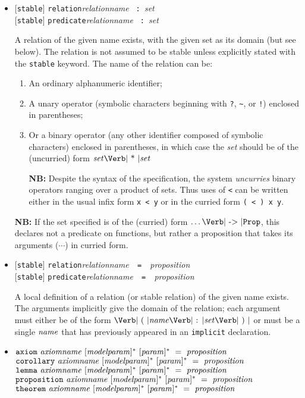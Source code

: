 \documentclass[12pt]{article}
\newcommand{\keywd}[1]{\mbox{\texttt{#1}}\xspace}
\newcommand{\AXIOM}{\keywd{axiom}}
\newcommand{\CONST}{\keywd{const}}
\newcommand{\COROLLARY}{\keywd{corollary}}
\newcommand{\IMPLICIT}{\keywd{implicit}}
\newcommand{\LEMMA}{\keywd{lemma}}
\newcommand{\PROP}{\keywd{Prop}}
\newcommand{\PROPOSITION}{\keywd{proposition}}
\newcommand{\PREDICATE}{\keywd{predicate}}
\newcommand{\RELATION}{\keywd{relation}}
\newcommand{\STABLE}{\keywd{stable}}
\newcommand{\THEOREM}{\keywd{theorem}}
\newcommand{\metav}[1]{\mbox{\textit{#1}}\xspace}
\newcommand{\Ident}{\metav{name}}
\newcommand{\Identifier}{\Ident}
\newcommand{\Setexp}{\metav{set}}
\newcommand{\Proposition}{\metav{proposition}}
\newcommand{\Param}{\metav{param}}
\newcommand{\MParam}{\metav{modelparam}}
\newcommand{\Term}{\metav{term}}
\newcommand{\COLON}{\mbox{\Verb| : |}}
\newcommand{\EQUALS}{\mbox{\Verb| = |}}
\newcommand{\LPAREN}{\mbox{\Verb| ( |}}
\newcommand{\RPAREN}{\mbox{\Verb| ) |}}
\newcommand{\TIMES}{\mbox{\Verb| * |}}
\newcommand{\TO}{\mbox{\Verb| -> |}}
\newcommand{\NB}{\textbf{NB: }}
\begin{document}
\begin{itemize}
      A local abbreviation of a term.  The set containing the constant
      may be inferred from the \Term.  The possible names are the same
      as in the previous case for \CONST.

\item{} [\STABLE{}] \RELATION \metav{relationname} \COLON \Setexp\\
     {} [\STABLE{}] \PREDICATE \metav{relationname} \COLON \Setexp
  
     A relation of the given name exists, with the given set as its
     domain (but see below).  The relation is not assumed to be stable
     unless explicitly stated with the \STABLE keyword.  The name of
     the relation can be:
\begin{enumerate}
\item  An ordinary alphanumeric identifier;
\item  A unary operator (symbolic characters beginning with \Verb|?|, \Verb|~|, or \Verb|!|) enclosed in parentheses;
\item  Or a binary operator (any other identifier composed of symbolic characters) enclosed in parentheses, in which case the \Setexp should be of the (uncurried) form $\Setexp \TIMES \Setexp$

\NB Despite the syntax of the specification, the system \emph{uncurries}
binary operators ranging over a product of sets.  Thus uses of
\Verb|<| can be written either in the usual infix form \Verb|x < y| or
in the curried form \Verb|( < ) x y|.
\end{enumerate}

\NB If the set specified is of the (curried) form $\ldots \TO \PROP$,
this declares not a predicate on functions, but rather a proposition
that takes its arguments ($\cdots$) in curried form.

\item{} [\STABLE{}] \RELATION \metav{relationname}\ \EQUALS\ \Proposition\\
     {} [\STABLE{}] \PREDICATE \metav{relationname}\ \EQUALS\ \Proposition
  
     A local definition of a relation (or stable relation) of the
     given name exists.  The arguments implicitly give the domain of
     the relation; each argument must either be of the form $\LPAREN
     \Identifier \COLON \Setexp \RPAREN$ or must be a single
     $\Identifier$ that has previously appeared in an \IMPLICIT
     declaration.


\item $\AXIOM\ \metav{axiomname}\ [\MParam]^*\ [\Param]^*\ =\ \Proposition$\\
      $\COROLLARY\ \metav{axiomname}\ [\MParam]^*\ [\Param]^*\ =\ \Proposition$\\
      $\LEMMA\ \metav{axiomname}\ [\MParam]^*\ [\Param]^*\ =\ \Proposition$\\
      $\PROPOSITION\ \metav{axiomname}\ [\MParam]^*\ [\Param]^*\ =\ \Proposition$\\
      $\THEOREM\ \metav{axiomname}\ [\MParam]^*\ [\Param]^*\ =\ \Proposition$
      

\end{itemize}
\end{document}
